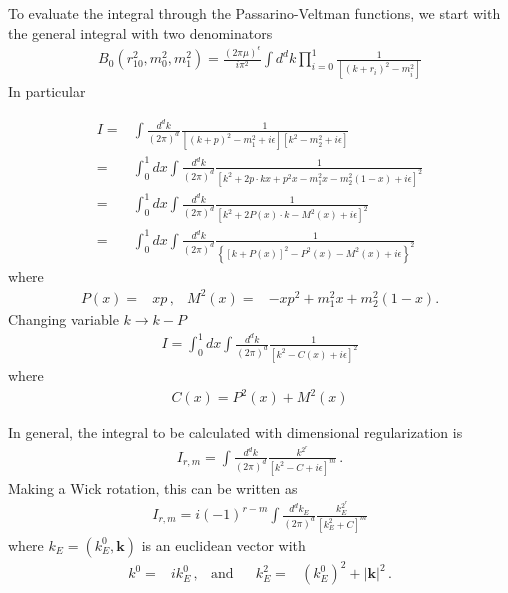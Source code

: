 To evaluate the integral through the Passarino-Veltman functions, we start with the general integral with two denominators
\begin{align}
  \label{eq:pvbo}
  B_{0}\left(r_{10}^{2}, m_{0}^{2}, m_{1}^{2}\right)=\frac{(2 \pi \mu)^{\epsilon}}{i \pi^{2}} \int d^{d} k \prod_{i=0}^{1} \frac{1}{\left[\left(k+r_{i}\right)^{2}-m_{i}^{2}\right]}
\end{align}
In particular

\begin{align}
  I =&\int \frac{d^{d} k}{(2 \pi)^{d}} \frac{1}{\left[(k+p)^{2}-m_{1}^{2}+i \epsilon\right]\left[k^{2}-m_{2}^{2}+i \epsilon\right]} \nonumber\\
    =&\int_{0}^{1} d x \int \frac{d^{d} k}{(2 \pi)^{d}} \frac{1}{\left[k^{2}+2 p \cdot k x+p^{2} x-m_{1}^{2} x-m_{2}^{2}(1-x)+i \epsilon\right]^{2}} \nonumber\\
  =&\int_{0}^{1} d x \int \frac{d^{d} k}{(2 \pi)^{d}} \frac{1}{\left[k^{2}+2 P(x) \cdot k-M^{2}(x)+i \epsilon\right]^{2}} \nonumber\\
  =&\int_{0}^{1} d x \int \frac{d^{d} k}{(2 \pi)^{d}} \frac{1}{\left\{[k+P(x)]^{2}-P^{2}(x)-M^{2}(x)+i \epsilon\right\}^{2}}
\end{align}
where
\begin{align}
  P(x)=&x p\,,& M^{2}(x)=&-x p^{2}+m_{1}^{2} x+m_{2}^{2}(1-x).
\end{align}
Changing variable $k\to k-P$
\begin{align}
  I=\int_{0}^{1} d x \int \frac{d^{d} k}{(2 \pi)^{d}} \frac{1}{\left[k^{2}-C(x)+i \epsilon\right]^{2}}
\end{align}
where
\begin{align}
  \label{eq:cx}
  C(x)=P^{2}(x)+M^{2}(x)
\end{align}


In general, the integral to be calculated with dimensional regularization is
\begin{align}
  I_{r, m}=\int \frac{d^{d} k}{(2 \pi)^{d}} \frac{k^{2^{r}}}{\left[k^{2}-C+i \epsilon\right]^{m}}\,.
\end{align}
Making a Wick rotation, this can be written as
\begin{align}
  I_{r, m}=i(-1)^{r-m} \int \frac{d^{d} k_{E}}{(2 \pi)^{d}} \frac{k_{E}^{2^{r}}}{\left[k_{E}^{2}+C\right]^{m}}
\end{align}
where $k_{E}=\left(k_{E}^{0}, \boldsymbol{k}\right)$ is an euclidean vector with
\begin{align}
  k^{0}=&i k_{E}^{0}\,,& \text{and} && k_{E}^{2}=&\left(k_{E}^{0}\right)^{2}+|\boldsymbol{k}|^{2}\,.
\end{align}


